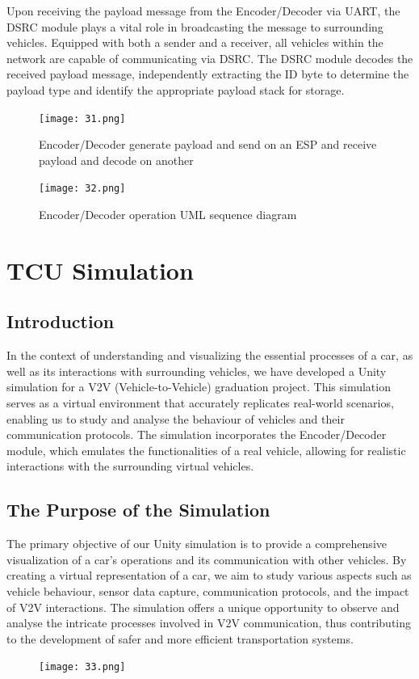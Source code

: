 \documentclass[
12pt,
oneside, 
onehalfspacing, 
nolistspacing, 
parskip, 
chapterinoneline, 
]{AASTCOMPUTER}
\begin{document}
Upon receiving the payload message from the Encoder/Decoder via UART, the DSRC module plays a vital role in broadcasting the message to surrounding vehicles. Equipped with both a sender and a receiver, all vehicles within the network are capable of communicating via DSRC. The DSRC module decodes the received payload message, independently extracting the ID byte to determine the payload type and identify the appropriate payload stack for storage.

\begin{figure}[!ht]
\centering
\texttt{[image: 31.png]}
\caption[EncoderDecoder generate payload and send on an ESP and receive payload and decode on another]{Encoder/Decoder generate payload and send on an ESP and receive payload and decode on another}
\label{fig:TCU}
\end{figure}
\begin{figure}[!ht]
\centering
\texttt{[image: 32.png]}
\caption[Encoder/Decoder operation UML sequence diagram]{Encoder/Decoder operation UML sequence diagram}
\label{fig:TCU}
\end{figure}
\chapter{TCU Simulation}
\section{Introduction}
In the context of understanding and visualizing the essential processes of a car, as well as its interactions with surrounding vehicles, we have developed a Unity simulation for a V2V (Vehicle-to-Vehicle) graduation project. This simulation serves as a virtual environment that accurately replicates real-world scenarios, enabling us to study and analyse the behaviour of vehicles and their communication protocols. The simulation incorporates the Encoder/Decoder module, which emulates the functionalities of a real vehicle, allowing for realistic interactions with the surrounding virtual vehicles.

\section{The Purpose of the Simulation}
The primary objective of our Unity simulation is to provide a comprehensive visualization of a car's operations and its communication with other vehicles. By creating a virtual representation of a car, we aim to study various aspects such as vehicle behaviour, sensor data capture, communication protocols, and the impact of V2V interactions. The simulation offers a unique opportunity to observe and analyse the intricate processes involved in V2V communication, thus contributing to the development of safer and more efficient transportation systems.
\begin{figure}[!ht]
\centering
\texttt{[image: 33.png]}
\caption[Simulation]{}
\label{fig:TCU}
\end{figure}
\end{document}
